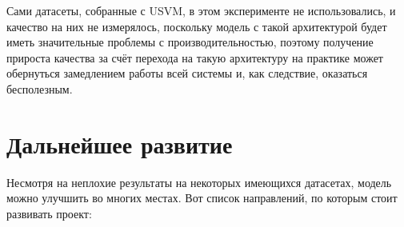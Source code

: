 Сами датасеты, собранные с USVM, в этом эксперименте не использовались, и качество на них не измерялось, поскольку модель с такой архитектурой будет иметь значительные проблемы с производительностью, поэтому получение прироста качества за счёт перехода на такую архитектуру на практике может обернуться замедлением работы всей системы и, как следствие, оказаться бесполезным.

\newpage

\section{Дальнейшее развитие} \label{future-works}

Несмотря на неплохие результаты на некоторых имеющихся датасетах, модель можно улучшить во многих местах. Вот список направлений, по которым стоит развивать проект:


